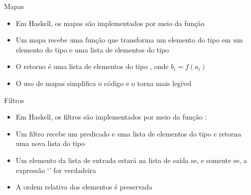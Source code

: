 \begin{frame}[fragile]{Mapas}

    \begin{itemize}
        \item Em Haskell, os mapas são implementados por meio da função 
        
        
        \item Um mapa recebe uma função  que transforma um elemento do tipo 
             em um elemento do tipo  e uma lista de elementos
            do tipo 

        \item O retorno é uma lista de elementos do tipo , onde
            $b_i = f(a_i)$
        
        \item O uso de mapas simplifica o código e o torna mais legível
 
    \end{itemize}

\end{frame}

\begin{frame}[fragile]{Filtros}

    \begin{itemize}
        \item Em Haskell, os filtros são implementados por meio da função :


        \item Um filtro recebe um predicado  e uma lista de elementos do tipo
             e retorna uma nova lista do tipo 

        \item Um elemento  da lista de entrada estará na lista de saída
            se, e somente se, a expressão `' for verdadeira

        \item A ordem relativa dos elementos é preservada

    \end{itemize}

\end{frame}

